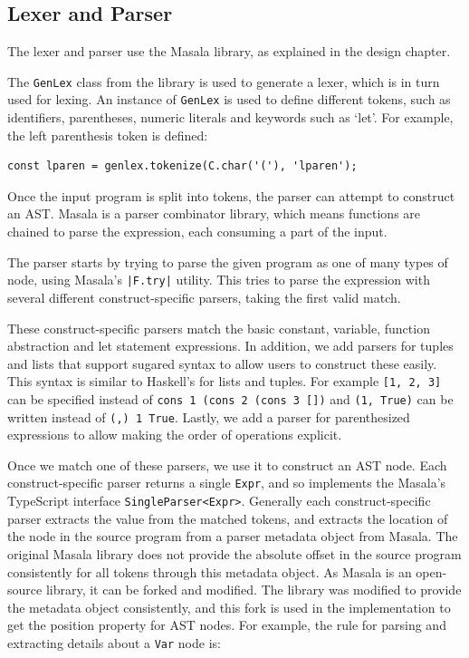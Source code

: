 \documentclass[a4paper,fleqn,oneside,12pt]{report}
\begin{document}
\subsection{Lexer and Parser}\label{id:h.qbtwwllp8tw6}

The lexer and parser use the Masala library, as explained in the design chapter.

The \texttt{GenLex} class from the library is used to generate a lexer, which is in turn used for lexing. An instance of \texttt{GenLex} is used to define different tokens, such as identifiers, parentheses, numeric literals and keywords such as `let'. For example, the left parenthesis token is defined:

\begin{verbatim}
const lparen = genlex.tokenize(C.char('('), 'lparen');
\end{verbatim}
Once the input program is split into tokens, the parser can attempt to construct an AST. Masala is a parser combinator library, which means functions are chained to parse the expression, each consuming a part of the input.

The parser starts by trying to parse the given program as one of many types of node, using Masala’s \texttt{|F.try|} utility. This tries to parse the expression with several different construct-specific parsers, taking the first valid match.

These construct-specific parsers match the basic constant, variable, function abstraction and let statement expressions. In addition, we add parsers for tuples and lists that support sugared syntax to allow users to construct these easily. This syntax is similar to Haskell's for lists and tuples. For example \texttt{[1, 2, 3]} can be specified instead of \texttt{cons 1 (cons 2 (cons 3 [])} and \texttt{(1, True)} can be written instead of \texttt{(,) 1 True}. Lastly, we add a parser for parenthesized expressions to allow making the order of operations explicit.

Once we match one of these parsers, we use it to construct an AST node. Each construct-specific parser returns a single \texttt{Expr}, and so implements the Masala's TypeScript interface \texttt{SingleParser<Expr>}. Generally each construct-specific parser extracts the value from the matched tokens, and extracts the location of the node in the source program from a parser metadata object from Masala. The original Masala library does not provide the absolute offset in the source program consistently for all tokens through this metadata object. As Masala is an open-source library, it can be forked and modified. The library was modified to provide the metadata object consistently, and this fork is used in the implementation to get the position property for AST nodes. For example, the rule for parsing and extracting details about a \texttt{Var} node is:
\end{document}
